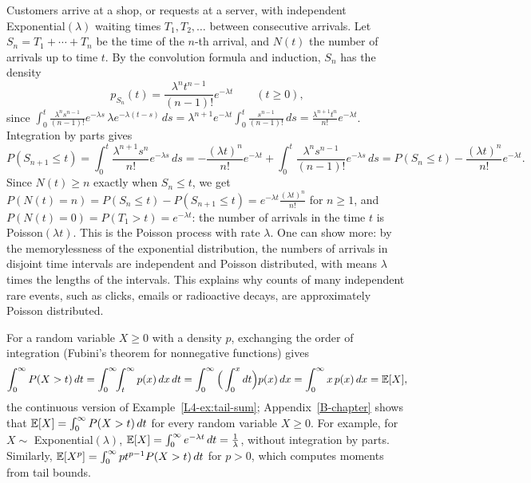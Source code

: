 \begin{example}\label{L4-ex:poisson-process}
    Customers arrive at a shop, or requests at a server, with independent Exponential$(\lambda)$ waiting times $T_1, T_2, \ldots$ between consecutive arrivals. Let $S_n = T_1 + \cdots + T_n$ be the time of the $n$-th arrival, and $N(t)$ the number of arrivals up to time $t$. By the convolution formula and induction, $S_n$ has the density
    \[p_{S_n}(t) = \frac{\lambda^nt^{n-1}}{(n - 1)!}e^{-\lambda t} \qquad (t \geq 0),\]
    since $\int_0^t \frac{\lambda^ns^{n-1}}{(n - 1)!}e^{-\lambda s}\,\lambda e^{-\lambda(t - s)}\, ds = \lambda^{n+1}e^{-\lambda t}\int_0^t \frac{s^{n-1}}{(n - 1)!}\, ds = \frac{\lambda^{n+1}t^n}{n!}e^{-\lambda t}$. Integration by parts gives
    \[P(S_{n+1} \leq t) = \int_0^t \frac{\lambda^{n+1}s^n}{n!}e^{-\lambda s}\, ds = -\frac{(\lambda t)^n}{n!}e^{-\lambda t} + \int_0^t \frac{\lambda^ns^{n-1}}{(n - 1)!}e^{-\lambda s}\, ds = P(S_n \leq t) - \frac{(\lambda t)^n}{n!}e^{-\lambda t}.\]
    Since $N(t) \geq n$ exactly when $S_n \leq t$, we get $P(N(t) = n) = P(S_n \leq t) - P(S_{n+1} \leq t) = e^{-\lambda t}\frac{(\lambda t)^n}{n!}$ for $n \geq 1$, and $P(N(t) = 0) = P(T_1 > t) = e^{-\lambda t}$: the number of arrivals in the time $t$ is Poisson$(\lambda t)$. This is the Poisson process with rate $\lambda$. One can show more: by the memorylessness of the exponential distribution, the numbers of arrivals in disjoint time intervals are independent and Poisson distributed, with means $\lambda$ times the lengths of the intervals. This explains why counts of many independent rare events, such as clicks, emails or radioactive decays, are approximately Poisson distributed.
\end{example}

\begin{example}\label{L4-ex:tail-integral}
    For a random variable $X \geq 0$ with a density $p$, exchanging the order of integration (Fubini's theorem for nonnegative functions) gives
    \[\int_0^\infty P(X > t)\, dt = \int_0^\infty\!\!\int_t^\infty p(x)\, dx\, dt = \int_0^\infty\Big(\int_0^x dt\Big)p(x)\, dx = \int_0^\infty x\,p(x)\, dx = \mathbb{E}[X],\]
    the continuous version of Example~\ref{L4-ex:tail-sum}; Appendix~\ref{B-chapter} shows that $\mathbb{E}[X] = \int_0^\infty P(X > t)\, dt$ for every random variable $X \geq 0$. For example, for $X \sim$ Exponential$(\lambda)$, $\mathbb{E}[X] = \int_0^\infty e^{-\lambda t}\, dt = \frac{1}{\lambda}$, without integration by parts. Similarly, $\mathbb{E}[X^p] = \int_0^\infty pt^{p-1}P(X > t)\, dt$ for $p > 0$, which computes moments from tail bounds.
\end{example}


